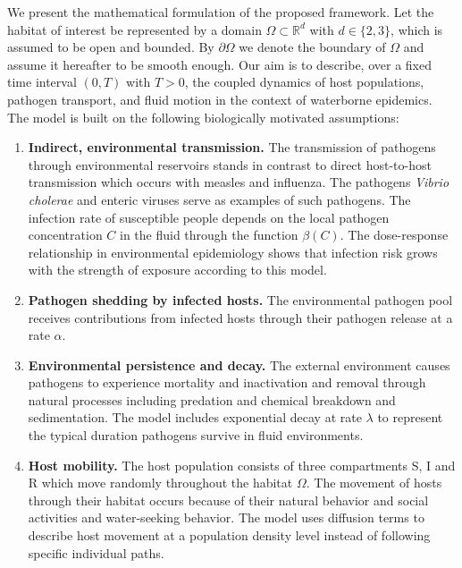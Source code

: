 \documentclass[10pt,number,preprint,times]{elsarticle}
\numberwithin{equation}{section} %
\begin{document}
We present the mathematical formulation of the proposed framework. Let the habitat of interest be represented by a domain $\Omega \subset \mathbb{R}^d$ with $d \in \{2,3\}$, which is assumed to be open and bounded. By $\partial \Omega$ we denote the boundary of $\Omega$ and assume it hereafter to be smooth enough. Our aim is to describe, over a fixed time interval $(0,T)$ with $T>0$, the coupled dynamics of host populations, pathogen transport, and fluid motion in the context of waterborne epidemics. The model is built on the following biologically motivated assumptions:

\begin{enumerate}[label=\textcolor{blue}{({A${{_\arabic*}}$})}]
	\item \label{a1} \textbf{Indirect, environmental transmission.}  
	The transmission of pathogens through environmental reservoirs stands in contrast to direct host-to-host transmission which occurs with measles and influenza. The pathogens \emph{Vibrio cholerae} and enteric viruses serve as examples of such pathogens. The infection rate of susceptible people depends on the local pathogen concentration $C$ in the fluid through the function $\beta(C)$. The dose-response relationship in environmental epidemiology shows that infection risk grows with the strength of exposure according to this model.
	
	\item \textbf{Pathogen shedding by infected hosts.}  
	The environmental pathogen pool receives contributions from infected hosts through their pathogen release at a rate $\alpha$. 
	
	\item \textbf{Environmental persistence and decay.}  
	The external environment causes pathogens to experience mortality and inactivation and removal through natural processes including predation and chemical breakdown and sedimentation. The model includes exponential decay at rate $\lambda$ to represent the typical duration pathogens survive in fluid environments. 
	
	\item \textbf{Host mobility.}  
	The host population consists of three compartments S, I and R which move randomly throughout the habitat $\Omega$. The movement of hosts through their habitat occurs because of their natural behavior and social activities and water-seeking behavior. The model uses diffusion terms to describe host movement at a population density level instead of following specific individual paths.
	

\end{enumerate}
\end{document}
